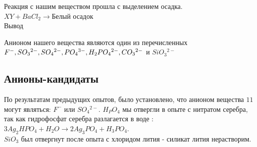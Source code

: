\documentclass[a4paper,14pt,notitlepage,twoside]{article}
\begin{document}
            Реакция с нашим веществом прошла с выделением осадка.
            $XY + BaCl_2 \to \mbox{Белый осадок}$\\

            Вывод 

            Анионом нашего вещества являются один из перечисленных 
            $F^-, SO_3{}^{2-}, SO_4{}^{2-}, \newline PO_4{}^{3-}, H_2PO_4{}^{2-}, CO_3{}^{2-}$ и 
            $SiO_3{}^{2-}$

        \subsection{Анионы-кандидаты}
            По результатам предыдущих опытов, было установлено, что анионом вещества 
            $11$ могут являться: $F^-$ или $ SO_4{}^{2-}$. $H_PO_4$ мы отвергли в опыте с
            нитратом серебра, так как гидрофосфат серебра разлагается в воде : \\

            $3Ag_2HPO_4 + H_2O \to 2Ag_3PO_4 + H_3PO_4$.\\

            $SiO_3$ был отвергнут после опыта с хлоридом лития - силикат лития нерастворим.
        
\end{document}
